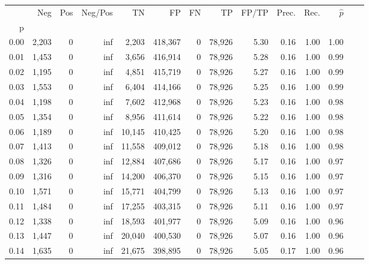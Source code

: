 \begin{tabular}{rrrrrrrrrrrrrr}
\toprule
{} &     Neg &    Pos &  Neg/Pos &       TN &       FP &      FN &      TP & FP/TP & Prec. &  Rec. & $\hat{p}$ \\
p    &         &        &          &          &          &         &         &       &       &       &           \\
\midrule
0.00 &   2,203 &      0 &      inf &    2,203 &  418,367 &       0 &  78,926 &  5.30 &  0.16 &  1.00 &      1.00 \\
0.01 &   1,453 &      0 &      inf &    3,656 &  416,914 &       0 &  78,926 &  5.28 &  0.16 &  1.00 &      0.99 \\
0.02 &   1,195 &      0 &      inf &    4,851 &  415,719 &       0 &  78,926 &  5.27 &  0.16 &  1.00 &      0.99 \\
0.03 &   1,553 &      0 &      inf &    6,404 &  414,166 &       0 &  78,926 &  5.25 &  0.16 &  1.00 &      0.99 \\
0.04 &   1,198 &      0 &      inf &    7,602 &  412,968 &       0 &  78,926 &  5.23 &  0.16 &  1.00 &      0.98 \\
0.05 &   1,354 &      0 &      inf &    8,956 &  411,614 &       0 &  78,926 &  5.22 &  0.16 &  1.00 &      0.98 \\
0.06 &   1,189 &      0 &      inf &   10,145 &  410,425 &       0 &  78,926 &  5.20 &  0.16 &  1.00 &      0.98 \\
0.07 &   1,413 &      0 &      inf &   11,558 &  409,012 &       0 &  78,926 &  5.18 &  0.16 &  1.00 &      0.98 \\
0.08 &   1,326 &      0 &      inf &   12,884 &  407,686 &       0 &  78,926 &  5.17 &  0.16 &  1.00 &      0.97 \\
0.09 &   1,316 &      0 &      inf &   14,200 &  406,370 &       0 &  78,926 &  5.15 &  0.16 &  1.00 &      0.97 \\
0.10 &   1,571 &      0 &      inf &   15,771 &  404,799 &       0 &  78,926 &  5.13 &  0.16 &  1.00 &      0.97 \\
0.11 &   1,484 &      0 &      inf &   17,255 &  403,315 &       0 &  78,926 &  5.11 &  0.16 &  1.00 &      0.97 \\
0.12 &   1,338 &      0 &      inf &   18,593 &  401,977 &       0 &  78,926 &  5.09 &  0.16 &  1.00 &      0.96 \\
0.13 &   1,447 &      0 &      inf &   20,040 &  400,530 &       0 &  78,926 &  5.07 &  0.16 &  1.00 &      0.96 \\
0.14 &   1,635 &      0 &      inf &   21,675 &  398,895 &       0 &  78,926 &  5.05 &  0.17 &  1.00 &      0.96 \\

\end{tabular}

